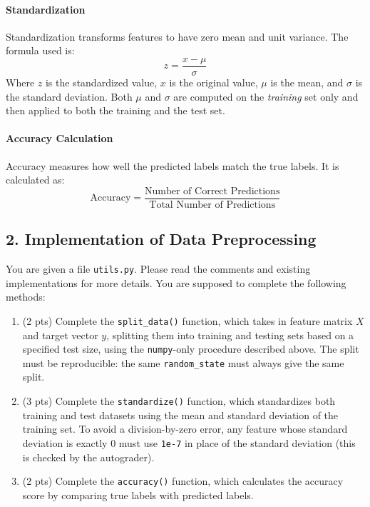 \documentclass{article}
\begin{document}
\paragraph{Standardization}
Standardization transforms features to have zero mean and unit variance. The formula used is:
\[
z = \frac{x - \mu}{\sigma}
\]
Where \(z\) is the standardized value, \(x\) is the original value, \(\mu\) is the mean, and \(\sigma\) is the standard deviation. Both \(\mu\) and \(\sigma\) are computed on the \emph{training} set only and then applied to both the training and the test set.

\paragraph{Accuracy Calculation}
Accuracy measures how well the predicted labels match the true labels. It is calculated as:
\[
\text{Accuracy} = \frac{\text{Number of Correct Predictions}}{\text{Total Number of Predictions}}
\]
\subsection*{2. Implementation of Data Preprocessing}
You are given a file \texttt{utils.py}. Please read the comments and existing implementations for more details. You are supposed to complete the following methods:
\begin{enumerate}
    \item (2 pts) Complete the \texttt{split\_\allowbreak data()} function, which takes in feature matrix \(X\) and target vector \(y\), splitting them into training and testing sets based on a specified test size, using the \texttt{numpy}-only procedure described above. The split must be reproducible: the same \texttt{random\_\allowbreak state} must always give the same split.
    \item (3 pts) Complete the \texttt{standardize()} function, which standardizes both training and test datasets using the mean and standard deviation of the training set. To avoid a division-by-zero error, any feature whose standard deviation is exactly 0 must use \texttt{1e-7} in place of the standard deviation (this is checked by the autograder).
    
    \item (2 pts) Complete the \texttt{accuracy()} function, which calculates the accuracy score by comparing true labels with predicted labels.

\end{enumerate}
\end{document}
